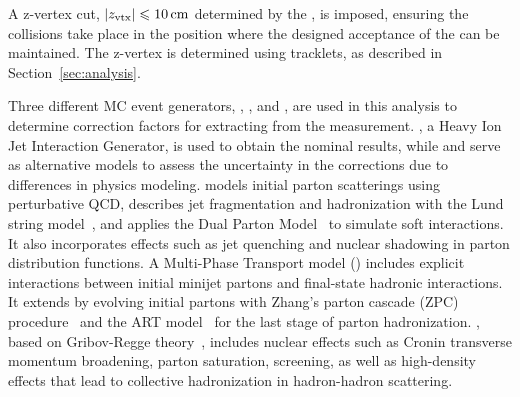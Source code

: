 
A z-vertex cut, $|z_\mathrm{vtx}|\leqslant10\rm \,cm$ determined by the \intt, is imposed, ensuring the collisions take place in the position where the designed acceptance of the \intt can be maintained.
The \intt z-vertex is determined using tracklets, as described in Section~\ref{sec:analysis}. %

Three different MC event generators, \hijing, \ampt, and \epos, are used in this analysis to determine correction factors for extracting \dndeta from the \sphenix \intt measurement. \hijing, a Heavy Ion Jet Interaction Generator, is used to obtain the nominal results, while \ampt and \epos serve as alternative models to assess the uncertainty in the corrections due to differences in physics modeling.
\hijing models initial parton scatterings using perturbative QCD, describes jet fragmentation and hadronization with the Lund string model~\cite{ANDERSSON1987289}, and applies the Dual Parton Model~\cite{Capella:1992yb} to simulate soft interactions. It also incorporates effects such as jet quenching and nuclear shadowing in parton distribution functions. A Multi-Phase Transport model (\ampt) includes explicit interactions between initial minijet partons and final-state hadronic interactions. It extends \hijing by evolving initial partons with Zhang's parton cascade (ZPC) procedure~\cite{Zhang:1997ej} and the ART model~\cite{Li:1995pra} for the last stage of parton hadronization. \epos, based on Gribov-Regge theory~\cite{gribov1968reggeon, Drescher:2000ha}, includes nuclear effects such as Cronin transverse momentum broadening, parton saturation, screening, as well as high-density effects that lead to collective hadronization in hadron-hadron scattering.


